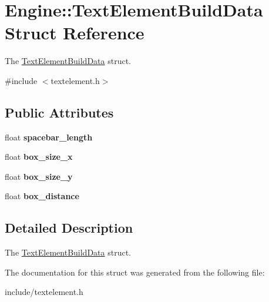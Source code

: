 \hypertarget{structEngine_1_1TextElementBuildData}{}\section{Engine\+:\+:Text\+Element\+Build\+Data Struct Reference}
\label{structEngine_1_1TextElementBuildData}


The \hyperlink{structEngine_1_1TextElementBuildData}{Text\+Element\+Build\+Data} struct.  




{\ttfamily \#include $<$textelement.\+h$>$}

\subsection*{Public Attributes}
\begin{DoxyCompactItemize}
\item 
\hypertarget{structEngine_1_1TextElementBuildData_a74cf1f6784c73713a3ec36739fb99c90}{}float {\bfseries spacebar\+\_\+length}\label{structEngine_1_1TextElementBuildData_a74cf1f6784c73713a3ec36739fb99c90}

\item 
\hypertarget{structEngine_1_1TextElementBuildData_a89dd70daf422b9563dcdca349584094a}{}float {\bfseries box\+\_\+size\+\_\+x}\label{structEngine_1_1TextElementBuildData_a89dd70daf422b9563dcdca349584094a}

\item 
\hypertarget{structEngine_1_1TextElementBuildData_a8cc27ae117ad2c86a01ac3e9c138f702}{}float {\bfseries box\+\_\+size\+\_\+y}\label{structEngine_1_1TextElementBuildData_a8cc27ae117ad2c86a01ac3e9c138f702}

\item 
\hypertarget{structEngine_1_1TextElementBuildData_a06208d25d60deaf7e3e998a438fcdf32}{}float {\bfseries box\+\_\+distance}\label{structEngine_1_1TextElementBuildData_a06208d25d60deaf7e3e998a438fcdf32}

\end{DoxyCompactItemize}


\subsection{Detailed Description}
The \hyperlink{structEngine_1_1TextElementBuildData}{Text\+Element\+Build\+Data} struct. 

The documentation for this struct was generated from the following file\+:\begin{DoxyCompactItemize}
\item 
include/textelement.\+h\end{DoxyCompactItemize}
